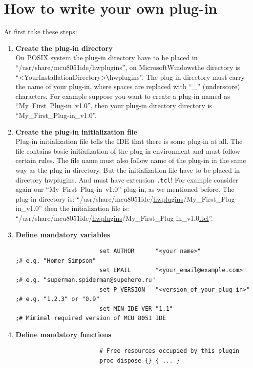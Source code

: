 \documentclass[a4paper,twoside,12pt]{book}
\newcommand{\fileextension}[1]{\texttt{#1}}
\newcommand{\mysmallfont}{\fontsize{8pt}{10pt} \selectfont{}}
\begin{document}
	\section{How to write your own plug-in}
		At first take these steps:
		\begin{enumerate}
 			\item \textbf{Create the plug-in directory}\label{plug-in directory} \\
				On POSIX system the plug-in directory have to be placed in\\
				``/usr/share/mcu8051ide/hwplugins'', on Microsoft\textregistered Windows\textregistered the directory is ``<YourInstallationDirectory>\verb'\'hwplugins''. The plug-in directory must carry the name of your plug-in, where spaces are replaced with ``\_'' (underscore) characters. For example suppose you want to create a plug-in named as ``My~First~Plug-in~v1.0'', then your plug-in directory directory is ``My\_First\_Plug-in\_v1.0''.
			\item \textbf{Create the plug-in initialization file} \\
				Plug-in initialization file tells the IDE that there is some plug-in at all. The file contains basic initialization of the plug-in environment and must follow certain rules. The file name must also follow name of the plug-in in the same way as the plug-in directory. But the initialization file have to be placed in directory hwplugins. And must have extension \fileextension{.tcl}! For example consider again our ``My~First~Plug-in~v1.0'' plug-in, as we mentioned before. The plug-in directory is: ``/usr/share/mcu8051ide/\underline{hwplugins}/My\_First\_Plug-in\_v1.0'' then the initialization file is:\\
				``/usr/share/mcu8051ide/\underline{hwplugins}/My\_First\_Plug-in\_v1.0\underline{.tcl}''.
			\item \textbf{Define mandatory variables} \\
				{
					\mysmallfont{}
					\begin{verbatim}
						set AUTHOR      "<your name>"                ;# e.g. "Homer Simpson"
						set EMAIL       "<your_email@example.com>"   ;# e.g. "superman.spiderman@supehero.ru"
						set P_VERSION   "<version_of_your_plug-in>"  ;# e.g. "1.2.3" or "0.9"
						set MIN_IDE_VER "1.1"                        ;# Mimimal required version of MCU 8051 IDE
					\end{verbatim}
				}
			\item \textbf{Define mandatory functions} \\
				{
					\mysmallfont{}
					\begin{verbatim}
						# Free resources occupied by this plugin
						proc dispose {} { ... }


\end{verbatim}}
\end{enumerate}
\end{document}
